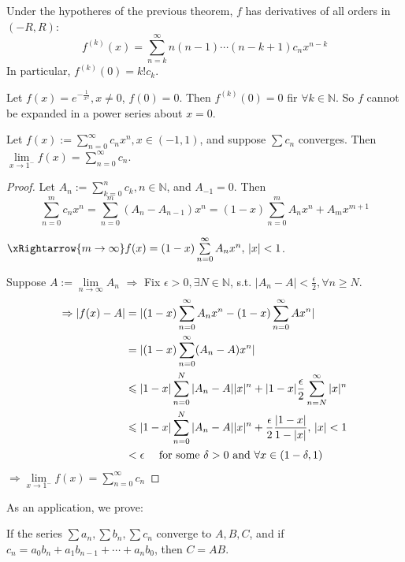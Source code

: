 \begin{corollary}
    
Under the hypotheres of the previous theorem,  $ f  $ has derivatives of all orders in  $ (-R,R) $:
\[f^{(k)}(x)=\sum\limits_{n=k}^{\infty} n(n-1)\cdots(n-k+1)c_nx^{n-k}\]
In particular,  $ f^{(k)}(0)=k!c_k $. 
\end{corollary}
\begin{example}
    Let  $ f(x)=e^{-\frac{1}{x^2}},x\not=0 $,  $ f(0)=0 $.
    Then  $ f^{(k)}(0)=0 $ fir  $ \forall k\in\mathbb{N } $.
    So  $ f  $  cannot be expanded in a power series about  $ x=0 $.    
\end{example}
\begin{theorem}
    Let  $ f(x):=\sum\limits_{n=0}^{\infty} c_nx^n, x\in(-1,1)  $, and suppose  $ \sum c_n  $ converges.
    Then  $ \lim\limits_{x\to1^-}f(x)=\sum\limits_{n=0 }^{\infty} c_n   $.  
\end{theorem}
\begin{proof}
    Let  $ A_n:=\sum\limits_{k=0 }^{n } c_k,n\in\mathbb{N }$, and  $ A_{-1}=0 $.
    Then   \[\sum\limits_{n=0 }^{m } c_nx^n =\sum\limits_{n=0 }^{m } (A_n-A_{n-1})x^n=(1-x)\sum\limits_{n=0}^{m  }A_nx^n+A_mx^{m+1}\]  
    
    $ \xRightarrow{m\rightarrow \infty} f(x)=(1-x)\sum\limits_{n=0}^{\infty}A_nx^n, \,|x|<1  $.
     
     Suppose  $ A:=\lim\limits_{n\to\infty } A_n   $  $ \Rightarrow $ Fix  $ \epsilon>0, \exists N\in\mathbb{N } $, s.t. $ |A_n-A|<\frac{\epsilon}{2},\forall n\geqslant N  $.
     \begin{align*}
        \Rightarrow|f(x)-A|&=|(1-x)\sum\limits_{n=0 }^{\infty}A_nx^n-(1-x)\sum\limits_{n=0 }^{\infty}Ax^n|\\
        &=|(1-x)\sum\limits_{n=0 }^{\infty} (A_n-A)x^n|  \\
        & \leqslant |1-x|\sum\limits_{n=0}^{N} |A_n-A||x|^n+|1-x|\frac{\epsilon}{2}\sum\limits_{n=N }^{\infty}|x|^n\\
        & \leqslant |1-x|\sum\limits_{n=0 }^{N } |A_n-A||x|^n+\frac{\epsilon }{2 }\frac{|1-x|}{1-|x|},\, |x|<1\\
        &<\epsilon \quad\text{ for some  $ \delta>0 $ and  $ \forall x\in (1-\delta,1) $ } 
     \end{align*} 
      $ \Rightarrow \lim\limits_{x\to1^-}f(x)=\sum\limits_{n=0 }^{\infty} c_n  $ 
\end{proof}
As an application, we prove:
\begin{theorem}
    If the series $ \sum a_n ,\sum b_n,\sum c_n $ converge to  $ A,B,C $, and if  $ c_n=a_0b_n+a_1b_{n-1}+\cdots+a_nb_0 $, then  $ C=AB $.   
\end{theorem}
